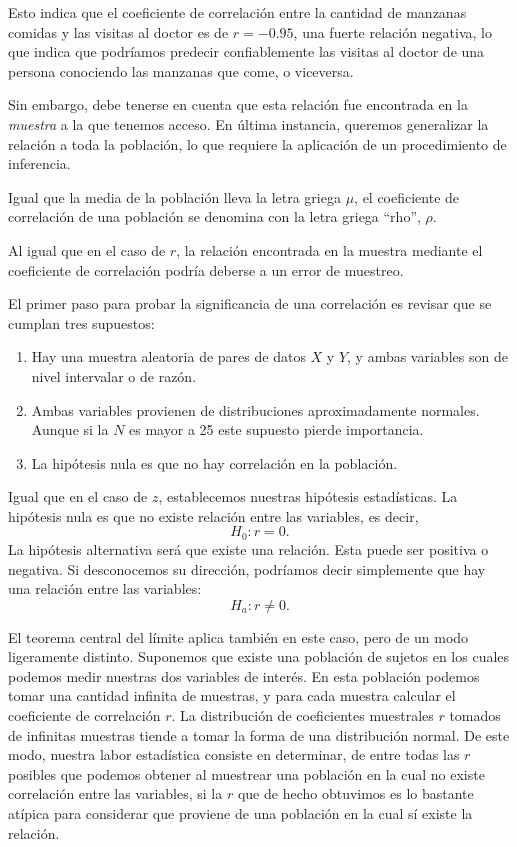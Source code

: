 \documentclass[a4paper,12pt]{article}
\begin{document}
Esto indica que el coeficiente de correlación entre la cantidad de manzanas comidas y las visitas al doctor es de $r = -0.95$, una fuerte relación negativa, lo que indica que podríamos predecir confiablemente las visitas al doctor de una persona conociendo las manzanas que come, o viceversa.

Sin embargo, debe tenerse en cuenta que esta relación fue encontrada en la {\slshape muestra} a la que tenemos acceso. En última instancia, queremos generalizar la relación a toda la población, lo que requiere la aplicación de un procedimiento de inferencia.

Igual que la media de la población lleva la letra griega $\mu$, el coeficiente de correlación de una población se denomina con la letra griega ``rho'', $\rho$.

Al igual que en el caso de $r$, la relación encontrada en la muestra mediante el coeficiente de correlación podría deberse a un error de muestreo.

El primer paso para probar la significancia de una correlación es revisar que se cumplan tres supuestos:
\begin{enumerate}
  \item Hay una muestra aleatoria de pares de datos $X$ y $Y$, y ambas variables son de nivel intervalar o de razón.
  \item Ambas variables provienen de distribuciones aproximadamente normales. Aunque si la $N$ es mayor a 25 este supuesto pierde importancia.
  \item La hipótesis nula es que no hay correlación en la población.
\end{enumerate}

Igual que en el caso de $z$, establecemos nuestras hipótesis estadísticas. La hipótesis nula es que no existe relación entre las variables, es decir,
\[
H_{0}: r = 0
.\]
La hipótesis alternativa será que existe una relación. Esta puede ser positiva o negativa. Si desconocemos su dirección, podríamos decir simplemente que hay una relación entre las variables:
\[
H_{a}: r \neq 0
.\]

El teorema central del límite aplica también en este caso, pero de un modo ligeramente distinto. Suponemos que existe una población de sujetos en los cuales podemos medir nuestras dos variables de interés. En esta población podemos tomar una cantidad infinita de muestras, y para cada muestra calcular el coeficiente de correlación $r$. La distribución de coeficientes muestrales $r$ tomados de infinitas muestras tiende a tomar la forma de una distribución normal. De este modo, nuestra labor estadística consiste en determinar, de entre todas las $r$ posibles que podemos obtener al muestrear una población en la cual no existe correlación entre las variables, si la $r$ que de hecho obtuvimos es lo bastante atípica para considerar que proviene de una población en la cual sí existe la relación.
\end{document}
